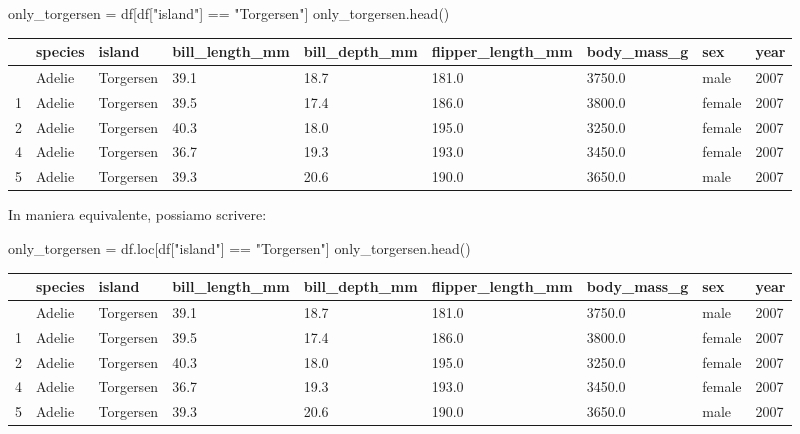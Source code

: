 \documentclass[
  letterpaper,
  krantz2]{{[}./krantz{]}}
\newenvironment{Shaded}{\begin{snugshade}}{\end{snugshade}}
\newcommand{\NormalTok}[1]{\textcolor[rgb]{0.00,0.23,0.31}{#1}}
\newcommand{\OperatorTok}[1]{\textcolor[rgb]{0.37,0.37,0.37}{#1}}
\newcommand{\StringTok}[1]{\textcolor[rgb]{0.13,0.47,0.30}{#1}}
\begin{document}
\begin{Shaded}
\begin{Highlighting}[]
\NormalTok{only\_torgersen }\OperatorTok{=}\NormalTok{ df[df[}\StringTok{"island"}\NormalTok{] }\OperatorTok{==} \StringTok{"Torgersen"}\NormalTok{]}
\NormalTok{only\_torgersen.head()}
\end{Highlighting}
\end{Shaded}

\begin{longtable}[]{@{}lllllllll@{}}
\toprule\noalign{}
& species & island & bill\_length\_mm & bill\_depth\_mm &
flipper\_length\_mm & body\_mass\_g & sex & year \\
\midrule\noalign{}
\endhead
\bottomrule\noalign{}
\endlastfoot
0 & Adelie & Torgersen & 39.1 & 18.7 & 181.0 & 3750.0 & male & 2007 \\
1 & Adelie & Torgersen & 39.5 & 17.4 & 186.0 & 3800.0 & female & 2007 \\
2 & Adelie & Torgersen & 40.3 & 18.0 & 195.0 & 3250.0 & female & 2007 \\
4 & Adelie & Torgersen & 36.7 & 19.3 & 193.0 & 3450.0 & female & 2007 \\
5 & Adelie & Torgersen & 39.3 & 20.6 & 190.0 & 3650.0 & male & 2007 \\
\end{longtable}

In maniera equivalente, possiamo scrivere:

\begin{Shaded}
\begin{Highlighting}[]
\NormalTok{only\_torgersen }\OperatorTok{=}\NormalTok{ df.loc[df[}\StringTok{"island"}\NormalTok{] }\OperatorTok{==} \StringTok{"Torgersen"}\NormalTok{]}
\NormalTok{only\_torgersen.head()}
\end{Highlighting}
\end{Shaded}

\begin{longtable}[]{@{}lllllllll@{}}
\toprule\noalign{}
& species & island & bill\_length\_mm & bill\_depth\_mm &
flipper\_length\_mm & body\_mass\_g & sex & year \\
\midrule\noalign{}
\endhead
\bottomrule\noalign{}
\endlastfoot
0 & Adelie & Torgersen & 39.1 & 18.7 & 181.0 & 3750.0 & male & 2007 \\
1 & Adelie & Torgersen & 39.5 & 17.4 & 186.0 & 3800.0 & female & 2007 \\
2 & Adelie & Torgersen & 40.3 & 18.0 & 195.0 & 3250.0 & female & 2007 \\
4 & Adelie & Torgersen & 36.7 & 19.3 & 193.0 & 3450.0 & female & 2007 \\
5 & Adelie & Torgersen & 39.3 & 20.6 & 190.0 & 3650.0 & male & 2007 \\
\end{longtable}
\end{document}
